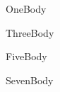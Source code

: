 \documentclass{pnpcards}
\newcommand{\VisibleReference}{MacroRef}
\begin{document}
\EnableCardDebugFrames
\begin{card}{One}Body\end{card}
\begin{card}[   ]{Three}Body\end{card}
\begin{card}[Alpha]{Five}Body\end{card}
\begin{card}[\VisibleReference]{Seven}Body\end{card}
\end{document}
